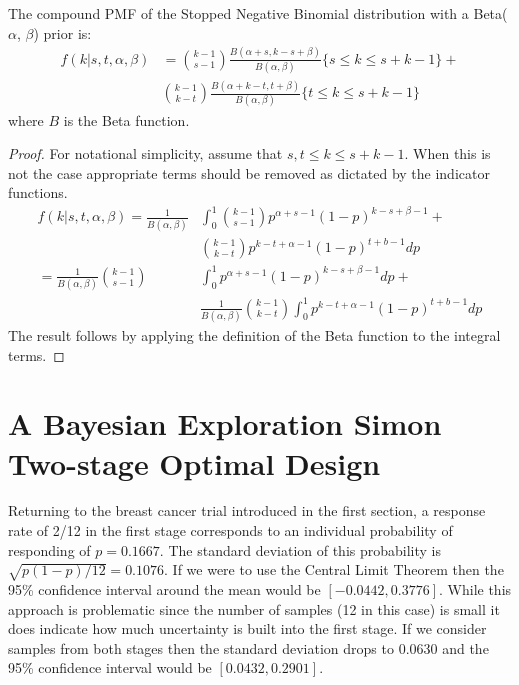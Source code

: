 \documentclass[12pt]{article}         %
\begin{document}
\begin{prop}
The compound PMF of the Stopped Negative Binomial distribution with a Beta($\alpha$, $\beta$) prior is:
\begin{align}
f(k | s, t, \alpha, \beta) &= {k-1 \choose s-1} \frac{B\left(\alpha+s, k-s+\beta \right)}{B(\alpha, \beta)} \{s \leq k \leq s+k-1\} + \nonumber \\
& {k-1 \choose k-t} \frac{B\left(\alpha + k - t, t+\beta\right)}{B(\alpha, \beta)} \{t \leq k \leq s+k-1\}
\end{align}
where $B$ is the Beta function.
\end{prop}
\begin{proof}
For notational simplicity, assume that $s,t \leq k \leq s+k-1$. When this is not the case appropriate terms should be removed as dictated by the indicator functions.
\begin{align*}
f(k | s, t, \alpha, \beta) = \frac{1}{B(\alpha, \beta)} & \int_0^1 {k-1 \choose s-1} p^{\alpha +s -1} \left(1-p\right)^{k-s+\beta-1} + \\
 & {k-1 \choose k-t} p^{k-t+\alpha-1}\left(1-p\right)^{t+b-1} dp \\
= \frac{1}{B(\alpha, \beta)}  {k-1 \choose s-1} & \int_0^1  p^{\alpha +s -1} \left(1-p\right)^{k-s+\beta-1} dp + \\
 & \frac{1}{B(\alpha, \beta)} {k-1 \choose k-t} \int_0^1  p^{k-t+\alpha-1}\left(1-p\right)^{t+b-1} dp
\end{align*}
The result follows by applying the definition of the Beta function to the integral terms.
\end{proof}

\section{A Bayesian Exploration Simon Two-stage Optimal Design}

Returning to the breast cancer trial introduced in the first section, a 
response rate of 2/12 in the first stage corresponds to an individual 
probability of responding of $p=0.1667$. The standard deviation of this 
probability is $\sqrt{p(1-p)/12}=0.1076$. If we were to use the Central 
Limit Theorem then the 95\% confidence interval around the mean would 
be $[-0.0442, 0.3776]$. While this approach is problematic since the number 
of samples (12 in this case) is small it does indicate how much uncertainty 
is built into the first stage. If we consider samples from both stages then 
the standard deviation drops to 0.0630 and the 95\% confidence interval 
would be $[0.0432, 0.2901]$.
\end{document}
